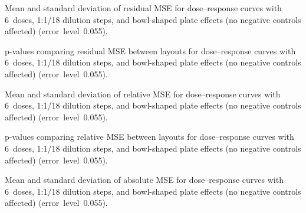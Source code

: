 \clearpage

\clearpage
\begin{table}[p]
    \centering
    \small
    
    \caption{Mean and standard deviation of residual MSE for dose--response curves with 6~doses, 1:1/18 dilution steps, and bowl-shaped plate effects (no negative controls affected) (error~level~0.055).}
    \label{tab:dr-residuals-mean-std-6doses-dil18-bowl-0.055}
\end{table}

\begin{table}[p]
    \centering
    \small
    
    \caption{p-values comparing residual MSE between layouts for dose--response curves with 6~doses, 1:1/18 dilution steps, and bowl-shaped plate effects (no negative controls affected) (error~level~0.055).}
    \label{tab:dr-residuals-pvalues-6doses-dil18-bowl-0.055}
\end{table}

\begin{table}[p]
    \centering
    \small
    
    \caption{Mean and standard deviation of relative \ECIC{} MSE for dose--response curves with 6~doses, 1:1/18 dilution steps, and bowl-shaped plate effects (no negative controls affected) (error~level~0.055).}
    \label{tab:dr-relic50-mean-std-6doses-dil18-bowl-0.055}
\end{table}

\begin{table}[p]
    \centering
    \small
    
    \caption{p-values comparing relative \ECIC{} MSE between layouts for dose--response curves with 6~doses, 1:1/18 dilution steps, and bowl-shaped plate effects (no negative controls affected) (error~level~0.055).}
    \label{tab:dr-relic50-pvalues-6doses-dil18-bowl-0.055}
\end{table}

\begin{table}[p]
    \centering
    \small
    
    \caption{Mean and standard deviation of absolute \ECIC{} MSE for dose--response curves with 6~doses, 1:1/18 dilution steps, and bowl-shaped plate effects (no negative controls affected) (error~level~0.055).}
    \label{tab:dr-absic50-mean-std-6doses-dil18-bowl-0.055}
\end{table}

